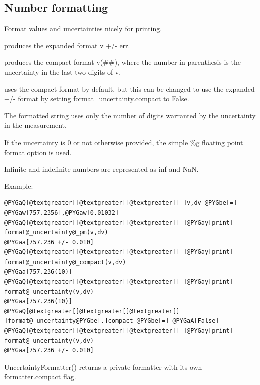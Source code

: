 \documentclass[letterpaper,10pt,english]{sphinxmanual}
\begin{document}
\label{api/mystic.formatnum:module-refl1d.mystic.formatnum}

\subsection{Number formatting}
\label{api/mystic.formatnum:number-formatting}
Format values and uncertainties nicely for printing.

{\hyperref[api/mystic.formatnum:refl1d.mystic.formatnum.format_uncertainty_pm]{}} produces the expanded format v +/- err.

{\hyperref[api/mystic.formatnum:refl1d.mystic.formatnum.format_uncertainty_compact]{}} produces the compact format v(\#\#),
where the number in parenthesis is the uncertainty in the last two digits of v.

 uses the compact format by default, but this
can be changed to use the expanded +/- format by setting
format\_uncertainty.compact to False.

The formatted string uses only the number of digits warranted by
the uncertainty in the measurement.

If the uncertainty is 0 or not otherwise provided, the simple
\%g floating point format option is used.

Infinite and indefinite numbers are represented as inf and NaN.

Example:

\begin{Verbatim}[commandchars=@\[\]]
@PYGaQ[@textgreater[]@textgreater[]@textgreater[] ]v,dv @PYGbe[=] @PYGaw[757.2356],@PYGaw[0.01032]
@PYGaQ[@textgreater[]@textgreater[]@textgreater[] ]@PYGay[print] format@_uncertainty@_pm(v,dv)
@PYGaa[757.236 +/- 0.010]
@PYGaQ[@textgreater[]@textgreater[]@textgreater[] ]@PYGay[print] format@_uncertainty@_compact(v,dv)
@PYGaa[757.236(10)]
@PYGaQ[@textgreater[]@textgreater[]@textgreater[] ]@PYGay[print] format@_uncertainty(v,dv)
@PYGaa[757.236(10)]
@PYGaQ[@textgreater[]@textgreater[]@textgreater[] ]format@_uncertainty@PYGbe[.]compact @PYGbe[=] @PYGaA[False]
@PYGaQ[@textgreater[]@textgreater[]@textgreater[] ]@PYGay[print] format@_uncertainty(v,dv)
@PYGaa[757.236 +/- 0.010]
\end{Verbatim}

UncertaintyFormatter() returns a private formatter with its own
formatter.compact flag.
\end{document}
